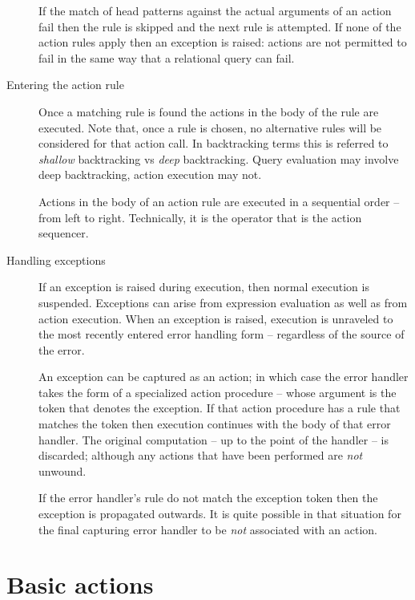 \begin{description}
If the match of head patterns against the actual arguments of an action fail then the rule is skipped and the next rule is attempted. If none of the action rules apply then an  exception is raised: actions are not permitted to fail in the same way that a relational query can fail.

\item[Entering the action rule]
Once a matching rule is found the actions in the body of the rule are executed. Note that, once a rule is chosen, no alternative rules will be considered for that action call. In backtracking terms this is referred to \emph{shallow} backtracking vs \emph{deep} backtracking. Query evaluation may involve deep backtracking, action execution may not.

Actions in the body of an action rule are executed in a sequential order -- from left to right. Technically, it is the \q{;} operator that is the action sequencer.

\item[Handling exceptions]
If an exception is raised during execution, then normal execution is suspended. Exceptions can arise from expression evaluation as well as from action execution. When an exception is raised, execution is unraveled to the most recently entered error handling form -- regardless of the source of the error.

An exception can be captured as an  action; in which case the error handler takes the form of a specialized action procedure -- whose argument is the token that denotes the exception. If that action procedure has a rule that matches the token then execution continues with the body of that error handler. The original computation -- up to the point of the handler -- is discarded; although any actions that have been performed are \emph{not} unwound.

If the error handler's rule do not match the exception token then the exception is propagated outwards. It is quite possible in that situation for the final capturing error handler to be \emph{not} associated with an action.
\end{description}

\section{Basic actions}
\label{action:basic}


